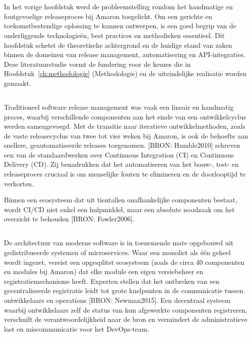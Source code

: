 \chapter{}%
\label{ch:stand-van-zaken}

In het vorige hoofdstuk werd de probleemstelling rondom het handmatige en foutgevoelige releaseproces bij Amaron toegelicht. Om een gerichte en toekomstbestendige oplossing te kunnen ontwerpen, is een goed begrip van de onderliggende technologieën, best practices en methodieken essentieel. Dit hoofdstuk schetst de theoretische achtergrond en de huidige stand van zaken binnen de domeinen van release management, automatisering en API-integraties. Deze literatuurstudie vormt de fundering voor de keuzes die in Hoofdstuk~\ref{ch:methodologie} (Methodologie) en de uiteindelijke realisatie worden gemaakt.

\section{}%
\label{sec:release-management}

Traditioneel software release management was vaak een lineair en handmatig proces, waarbij verschillende componenten aan het einde van een ontwikkelcyclus werden samengevoegd. Met de transitie naar iteratieve ontwikkelmethoden, zoals de vaste releasecyclus van twee tot vier weken bij Amaron, is ook de behoefte aan snellere, geautomatiseerde releases toegenomen. [BRON: Humble2010] %
schreven een van de standaardwerken over Continuous Integration (CI) en Continuous Delivery (CD). Zij benadrukken dat het automatiseren van het bouw-, test- en releaseproces cruciaal is om menselijke fouten te elimineren en de doorlooptijd te verkorten. 

Binnen een ecosysteem dat uit tientallen onafhankelijke componenten bestaat, wordt CI/CD niet enkel een hulpmiddel, maar een absolute noodzaak om het overzicht te behouden [BRON: Fowler2006]. %

\section{}%
\label{sec:component-registry}

De architectuur van moderne software is in toenemende mate opgebouwd uit gedistribueerde systemen of microservices. Waar een monoliet als één geheel wordt ingezet, vereist een opgesplitst ecosysteem (zoals de circa 40 componenten en modules bij Amaron) dat elke module een eigen versiebeheer en registratiemechanisme heeft. Experten stellen dat het ontbreken van een gecentraliseerde registratie leidt tot grote knelpunten in de communicatie tussen ontwikkelaars en operations [BRON: Newman2015]. %
Een decentraal systeem waarbij ontwikkelaars zelf de status van hun afgewerkte componenten registreren, verschuift de verantwoordelijkheid naar de bron en vermindert de administratieve last en miscommunicatie voor het DevOps-team.

